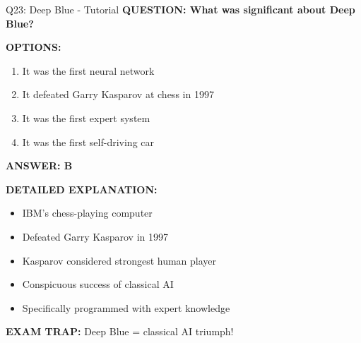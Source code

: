 \documentclass[8pt]{beamer}
\begin{document}
	\begin{frame}{Q23: Deep Blue - Tutorial}
		\fontsize{6.5}{7.5}\selectfont
		\textbf{QUESTION: What was significant about Deep Blue?}
		
		\vspace{0.1cm}
		\textbf{OPTIONS:}
		\begin{enumerate}
			\item It was the first neural network
			\item It defeated Garry Kasparov at chess in 1997
			\item It was the first expert system
			\item It was the first self-driving car
		\end{enumerate}
		
		\vspace{0.1cm}
		\textcolor{myblue}{\textbf{ANSWER: B}}
		
		\vspace{0.1cm}
		\textbf{DETAILED EXPLANATION:}
		\begin{itemize}
			\item IBM's chess-playing computer
			\item Defeated Garry Kasparov in 1997
			\item Kasparov considered strongest human player
			\item Conspicuous success of classical AI
			\item Specifically programmed with expert knowledge
		\end{itemize}
		
		\vspace{0.1cm}
		\textcolor{myred}{\textbf{EXAM TRAP:}} Deep Blue = \textcolor{myblue}{classical AI triumph}!
	\end{frame}
	
\end{document}

